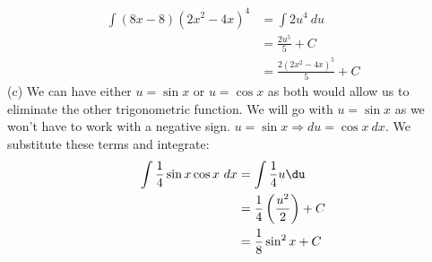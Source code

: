 \documentclass[11pt]{scrartcl}
\begin{document}
\begin{align*}
\int (8x-8)(2x^2-4x)^4 &= \int{2u^4 \ du} \\
                       &= \frac{2u^5}{5}+C \\
                       &=\frac{2(2x^2-4x)^5}{5}+C
\end{align*}
(c) We can have either $u=\sin x$ or $u=\cos x$ as both would allow us to eliminate the other trigonometric function. We will go with $u= \sin x$ as we won't have to work with a negative sign. $u= \sin x \Rightarrow du=\cos x \ dx$. We substitute these terms and integrate: 
\begin{align*}
    \int \frac{1}{4}\sin x \cos x \ dx &=\int \frac{1}{4} u \du \\
                                       &= \frac{1}{4}\left(\frac{u^2}{2}\right)+C\\
                                       &=\frac{1}{8}\sin ^2 x +C
\end{align*}
\end{document}
